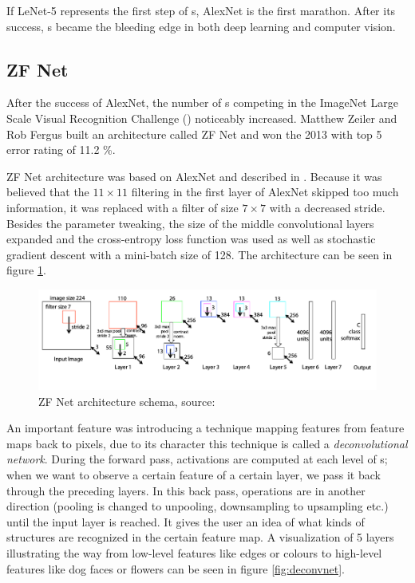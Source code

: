 If LeNet-5 represents the first step of s, AlexNet is the first 
marathon. After its success, s became the bleeding edge in both deep 
learning and computer vision. 


\subsection{ZF Net}
\label{zfnet}

After the success of AlexNet, the number of s competing in the ImageNet 
Large Scale Visual Recognition Challenge () noticeably increased. 
Matthew Zeiler and Rob Fergus built an architecture called ZF Net and won the 
 2013 with top 5 error rating of 11.2 \%. 

ZF Net architecture was based on AlexNet and described in \cite{zf-net}. Because 
it was believed that the $11 \times 11$ filtering in the first layer of AlexNet 
skipped too much information, it was replaced with a filter of size $7 \times 7$ 
with a decreased stride. Besides the parameter tweaking, the size of the middle 
convolutional layers expanded and the cross-entropy loss function was used as 
well as stochastic gradient descent with a mini-batch size of 128. The 
architecture can be seen in figure \ref{fig:zf-net}.

\begin{figure}[H]
   \centering
	\includegraphics[width=\linewidth]{./pictures/zf-net.png}
	\caption[ZF Net architecture]{ZF Net architecture schema, source: 
\cite{zf-net}}
      \label{fig:zf-net}
\end{figure}

An important feature was introducing a technique mapping features from feature 
maps back to pixels, due to its character this technique is called a 
\textit{deconvolutional network}. During the forward pass, activations are 
computed at each level of s; when we want to observe a certain feature 
of a certain layer, we pass it back through the preceding layers. In this back 
pass, operations are in another direction (pooling is changed to unpooling, 
downsampling to upsampling etc.) until the input layer is reached. It gives the 
user an idea of what kinds of structures are recognized in the certain feature 
map. A visualization of 5 layers illustrating the way from low-level features 
like edges or colours to high-level features like dog faces or flowers can be 
seen in figure \ref{fig:deconvnet}.

